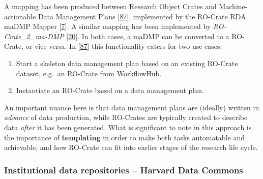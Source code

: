 A mapping has been produced between Research Object Crates and
Machine-actionable Data Management Plans
{[}\href{https://doi.org/10.4126/frl01-006423291}{87}{]}, implemented by
the RO-Crate RDA maDMP Mapper
{[}\href{https://doi.org/10.5281/zenodo.3922136}{7}{]}. A similar
mapping has been implemented by \emph{RO-Crate\_2\_ma-DMP}
{[}\href{https://doi.org/10.5281/zenodo.3903463}{20}{]}. In both cases,
a maDMP can be converted to a RO-Crate, or vice versa. In
{[}\href{https://doi.org/10.4126/frl01-006423291}{87}{]} this
functionality caters for two use cases:

\begin{enumerate}
\def\labelenumi{\arabic{enumi}.}
\tightlist
\item
  Start a skeleton data management plan based on an existing RO-Crate
  dataset, e.g.~an RO-Crate from WorkflowHub.
\item
  Instantiate an RO-Crate based on a data management plan.
\end{enumerate}

An important nuance here is that data management plans are (ideally)
written in \emph{advance} of data production, while RO-Crates are
typically created to describe data \emph{after} it has been generated.
What is significant to note in this approach is the importance of
\textbf{templating} in order to make both tasks automatable and
achievable, and how RO-Crate can fit into earlier stages of the research
life cycle.

\hypertarget{institutionalrepos}{%
\subsubsection{Institutional data repositories -- Harvard Data
Commons}\label{institutionalrepos}}

